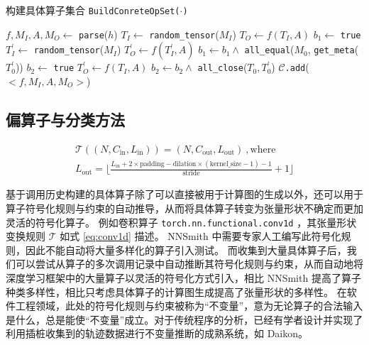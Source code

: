\begin{algorithm}
    \caption{构建具体算子集合 \texttt{BuildConreteOpSet($\cdot$)}}
    \label{algo:build_copset}

 {
    $f, M_I, A, M_O \gets$ \texttt{parse}($h$) 
    $T_I \gets$ \texttt{random\_tensor}($M_I$) 
    $T_O \gets f(T_I, A)$ 
     {
        $b_1 \gets$ \texttt{true} \label{algo:build_copset:meq:s}\;
         {
            $T_I^{'} \gets$ \texttt{random\_tensor}($M_I$)\;
            $T_O^{'} \gets f(T_I^{'}, A)$\;
            $b_1 \gets b_1 \wedge$ \texttt{all\_equal}($M_0$, \texttt{get\_meta}($T_0^{'}$))\;
        }
         {\Continue} \label{algo:build_copset:meq:e}
        $b_2 \gets$ \texttt{true} \label{algo:build_copset:tclose:s} \;
         {
            $T_O^{'} \gets f(T_I, A)$\;
            $b_2 \gets b_2 \wedge$ \texttt{all\_close}($T_0, T_0^{'}$)\;
        }
         {\Continue} \label{algo:build_copset:tclose:e}
        $\mathcal{C}$\texttt{.add}($<f, M_I, A, M_O>$)\;
    }
}
\end{algorithm}

\subsection{偏算子与分类方法}

\begin{equation}
\label{eq:conv1d}
\begin{gathered}
\mathcal{T}((N, C_\text{in}, L_\text{in})) = 
(N, C_\text{out}, L_\text{out}) ~, \text{where} \\
L_\text{out} =
\lfloor \frac{L_\text{in} + 2 \times \text{padding} - \text{dilation} \times (\text{kernel\_size} - 1) - 1}{\text{stride}} + 1 \rfloor
\end{gathered}
\end{equation}


基于调用历史构建的具体算子除了可以直接被用于计算图的生成以外，还可以用于算子符号化规则与约束的自动推导，从而将具体算子转变为张量形状不确定而更加灵活的符号化算子。
例如卷积算子 \texttt{torch.nn.functional.conv1d} ，其张量形状变换规则 $\mathcal{T}$ 如式 \eqref{eq:conv1d} 描述\cite{torch_conv1d}。
NNSmith 中需要专家人工编写此符号化规则，因此不能自动将大量多样化的算子引入测试。
而收集到大量具体算子后，我们可以尝试从算子的多次调用记录中自动推断其符号化规则与约束，从而自动地将深度学习框架中的大量算子以灵活的符号化方式引入，相比 NNSmith 提高了算子种类多样性，相比只考虑具体算子的计算图生成提高了张量形状的多样性。
在软件工程领域，此处的符号化规则与约束被称为“不变量”，意为无论算子的合法输入是什么，总是能使“不变量”成立。对于传统程序的分析，已经有学者设计并实现了利用插桩收集到的轨迹数据进行不变量推断的成熟系统，如 Daikon\cite{daikon}。

